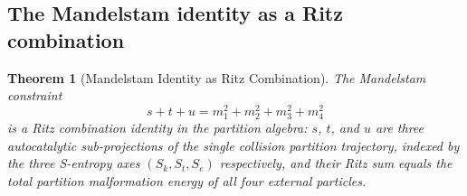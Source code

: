 \documentclass[twocolumn,10pt,a4paper]{article}
\theoremstyle{thmstyle}
\newtheorem{theorem}{Theorem}[section]
\theoremstyle{definition}
\theoremstyle{remark}
\newcommand{\Sk}{S_{k}}
\newcommand{\St}{S_{t}}
\newcommand{\Se}{S_{e}}
\begin{document}
\subsection{The Mandelstam identity as a Ritz combination}

\begin{theorem}[Mandelstam Identity as Ritz Combination]
\label{thm:mandelstam_ritz}
The Mandelstam constraint
\begin{equation}
s + t + u = m_1^2 + m_2^2 + m_3^2 + m_4^2
\label{eq:mandelstam}
\end{equation}
is a Ritz combination identity in the partition algebra: $s$, $t$, and $u$
are three autocatalytic sub-projections of the single collision partition
trajectory, indexed by the three S-entropy axes $(\Sk, \St, \Se)$
respectively, and their Ritz sum equals the total partition malformation
energy of all four external particles.
\end{theorem}
\end{document}
